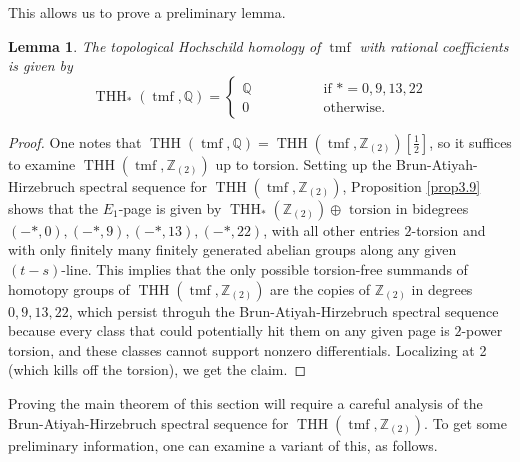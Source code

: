 \documentclass[11pt,leqno]{article}
\newcommand{\zz}{\mathbb{Z}}
\newcommand{\bb}[1]{\mathbb{#1}}
\DeclareMathOperator{\THH}{THH}
\DeclareMathOperator{\tmf}{tmf}
\newcommand{\f}[2]{\frac{#1}{#2}}
\newtheorem*{short hand}{theorem name}
\theoremstyle{plain}  %
\newtheorem{lemma}{Lemma}[section]
\theoremstyle{definition}
\numberwithin{equation}{section}
\begin{document}
This allows us to prove a preliminary lemma.
\begin{lemma}\label{lem3.10}
The topological Hochschild homology of $\tmf$ with rational coefficients is given by $$\THH_*(\tmf,\bb{Q})=\begin{cases}
	\bb{Q} \qquad\qquad & \text{ if }*=0,9,13,22\\
	0 \qquad\qquad &\text{ otherwise.}
\end{cases}$$
\end{lemma}
\begin{proof}
One notes that $\THH(\tmf,\bb{Q})=\THH(\tmf,\zz_{(2)})[\f{1}{2}]$, so it suffices to examine $\THH(\tmf,\zz_{(2)})$ up to torsion.  Setting up the Brun-Atiyah-Hirzebruch spectral sequence for $\THH(\tmf,\zz_{(2)})$, Proposition \ref{prop3.9} shows that the $E_1$-page is given by $\THH_{*}(\zz_{(2)})\oplus\text{ torsion}$ in bidegrees $(-*,0),(-*,9),(-*,13),(-*,22)$, with all other entries $2$-torsion and with only finitely many finitely generated abelian groups along any given $(t-s)$-line.  This implies that the only possible torsion-free summands of homotopy groups of $\THH(\tmf,\zz_{(2)})$ are the copies of $\zz_{(2)}$ in degrees $0,9,13,22$, which persist throguh the Brun-Atiyah-Hirzebruch spectral sequence because every class that could potentially hit them on any given page is $2$-power torsion, and these classes cannot support nonzero differentials.  Localizing at 2 (which kills off the torsion), we get the claim.
\end{proof}
Proving the main theorem of this section will require a careful analysis of the Brun-Atiyah-Hirzebruch spectral sequence for $\THH(\tmf,\zz_{(2)})$.  To get some preliminary information, one can examine a variant of this, as follows.
\end{document}
